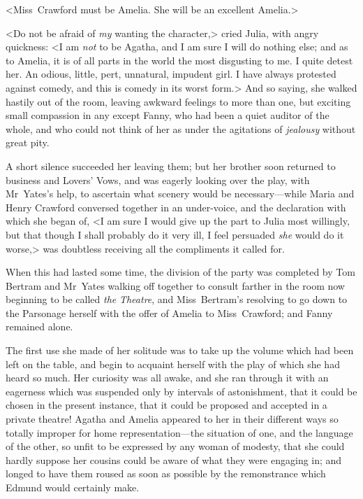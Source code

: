 <Miss~Crawford must be Amelia. She will be an excellent Amelia.>

<Do not be afraid of \textit{my}  wanting the character,> cried Julia, with angry quickness: <I am \textit{not}  to be Agatha, and I am sure I will do nothing else; and as to Amelia, it is of all parts in the world the most disgusting to me. I quite detest her. An odious, little, pert, unnatural, impudent girl. I have always protested against comedy, and this is comedy in its worst form.> And so saying, she walked hastily out of the room, leaving awkward feelings to more than one, but exciting small compassion in any except Fanny, who had been a quiet auditor of the whole, and who could not think of her as under the agitations of \textit{jealousy}  without great pity.

A short silence succeeded her leaving them; but her brother soon returned to business and Lovers' Vows, and was eagerly looking over the play, with Mr~Yates's help, to ascertain what scenery would be necessary—while Maria and Henry Crawford conversed together in an under-voice, and the declaration with which she began of, <I am sure I would give up the part to Julia most willingly, but that though I shall probably do it very ill, I feel persuaded \textit{she}  would do it worse,> was doubtless receiving all the compliments it called for.

When this had lasted some time, the division of the party was completed by Tom Bertram and Mr~Yates walking off together to consult farther in the room now beginning to be called \textit{the}  \textit{Theatre}, and Miss~Bertram's resolving to go down to the Parsonage herself with the offer of Amelia to Miss~Crawford; and Fanny remained alone.

The first use she made of her solitude was to take up the volume which had been left on the table, and begin to acquaint herself with the play of which she had heard so much. Her curiosity was all awake, and she ran through it with an eagerness which was suspended only by intervals of astonishment, that it could be chosen in the present instance, that it could be proposed and accepted in a private theatre! Agatha and Amelia appeared to her in their different ways so totally improper for home representation—the situation of one, and the language of the other, so unfit to be expressed by any woman of modesty, that she could hardly suppose her cousins could be aware of what they were engaging in; and longed to have them roused as soon as possible by the remonstrance which Edmund would certainly make. 